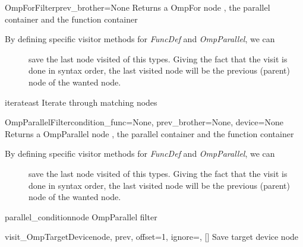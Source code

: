 \documentclass[a4paper,10pt,english]{manual}
\begin{document}
\hypertarget{Backends.CudaBackend.Visitors.CM\_Visitors.OmpForFilter}{}\begin{classdesc}{OmpForFilter}{prev\_brother=None}
Returns a OmpFor node , the parallel container and the function container
\begin{description}
\item[By defining specific visitor methods for \emph{FuncDef} and \emph{OmpParallel}, we can] \leavevmode
save the last node visited of this types. Giving the fact that the visit is
done in syntax order, the last visited node will be the previous (parent) node
of the wanted node.

\end{description}

\hypertarget{Backends.CudaBackend.Visitors.CM\_Visitors.OmpForFilter.iterate}{}\begin{methoddesc}{iterate}{ast}
Iterate through matching nodes
\end{methoddesc}
\end{classdesc}

\hypertarget{Backends.CudaBackend.Visitors.CM\_Visitors.OmpParallelFilter}{}\begin{classdesc}{OmpParallelFilter}{condition\_func=None, prev\_brother=None, device=None}
Returns a OmpParallel node , the parallel container and the function container
\begin{description}
\item[By defining specific visitor methods for \emph{FuncDef} and \emph{OmpParallel}, we can] \leavevmode
save the last node visited of this types. Giving the fact that the visit is
done in syntax order, the last visited node will be the previous (parent) node
of the wanted node.

\end{description}

\hypertarget{Backends.CudaBackend.Visitors.CM\_Visitors.OmpParallelFilter.parallel\_condition}{}\begin{methoddesc}{parallel\_condition}{node}
OmpParallel filter
\end{methoddesc}

\hypertarget{Backends.CudaBackend.Visitors.CM\_Visitors.OmpParallelFilter.visit\_OmpTargetDevice}{}\begin{methoddesc}{visit\_OmpTargetDevice}{node, prev, offset=1, ignore=, {[}{]}}
Save target device node
\end{methoddesc}
\end{classdesc}
\end{document}
